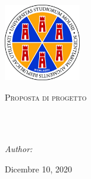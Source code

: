 \documentclass[ 11pt, oneside, italian, onehalfspacing, headsepline, ]{MastersDoctoralThesis}
\author{Daniele \textsc{Albanese}} %
\begin{document}
\renewenvironment{abstract}


\pagestyle{plain} %


\begin{titlepage}
	\begin{center}
				
		\vspace*{.06\textheight}
		{\scshape\LARGE \univname\par}\vspace{0.5cm} %
		{\scshape\large \deptname\par}\vspace{1cm} %
				
		\includegraphics[width=0.25\textwidth]{images/logo.png} %
		\vspace{1cm}
				
		\textsc{\Large Proposta di progetto}\\[0.5cm] %
				
		\HRule\\[0.4cm] %
		{\huge \bfseries \ttitle\par}\vspace{0.4cm} %
		\HRule\\[1.5cm] %
				
				
		\begin{center} \large
			\emph{Author:}\\
			\href{mailto:d.albanese1@studenti.unimol.it}{\authorname} %
		\end{center}
				
		\centerline{\large \subjectname}
				
		{\large Dicembre 10, 2020}\\[2cm] %
		\vfill
	\end{center}
\end{titlepage}
\end{document}
